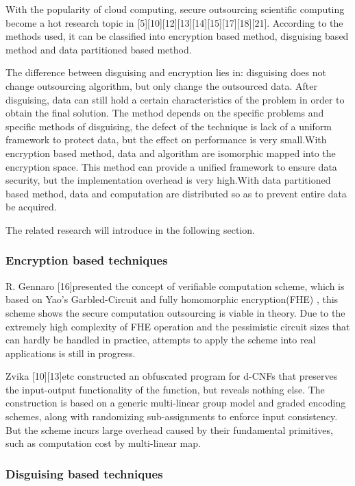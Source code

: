 \documentclass[runningheads,a4paper]{llncs}
\begin{document}
With the popularity of cloud computing, secure outsourcing scientific computing become a hot research topic in [5][10][12][13][14][15][17][18][21]. According to the methods used, it can be classified into encryption based method, disguising based method and data partitioned based method.

The difference between disguising and encryption lies in: disguising does not change outsourcing algorithm, but only change the outsourced data. After disguising, data can still hold a certain characteristics of the problem in order to obtain the final solution. The method depends on the specific problems and specific methods of disguising, the defect of the technique is lack of a uniform framework to protect data, but the effect on performance is very small.With encryption based method, data and algorithm are isomorphic mapped into the encryption space. This method can provide a unified framework to ensure data security, but the implementation overhead is very high.With data partitioned based method, data and computation are distributed so as to prevent entire data be acquired.    

The related research will introduce in the following section.
\subsubsection{Encryption based techniques}

R. Gennaro [16]presented the concept of verifiable computation scheme, which is based on Yao’s Garbled-Circuit and fully homomorphic encryption(FHE) , this scheme shows the secure computation outsourcing is viable in theory. Due to the extremely high complexity of FHE operation and the pessimistic circuit sizes that can hardly be handled in practice, attempts to apply the scheme into real applications is still in progress.

Zvika [10][13]etc constructed an obfuscated program for d-CNFs that preserves the input-output functionality of the function, but reveals nothing else. The construction is based on a generic multi-linear group model and graded encoding schemes, along with randomizing sub-assignments to enforce input consistency. But the scheme incurs large overhead caused by their fundamental primitives, such as computation cost by multi-linear map.
\subsubsection{Disguising based techniques}
\end{document}
